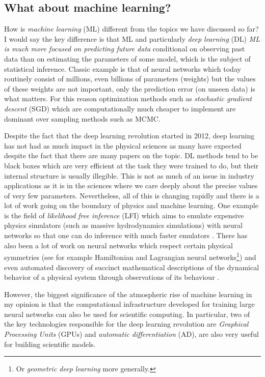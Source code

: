 \documentclass[12pt,dvipsnames]{report}
\begin{document}
\subsection{What about machine learning?}
How is \textsl{machine learning} (ML) different from the topics we have discussed so far? 
I would say the key difference is that ML and particularly \textsl{deep learning} (DL) 
\emph{ML is much more focused on predicting future data} conditional on observing 
past data  than on estimating the parameters of some model, which is the subject of 
statistical inference. Classic example is that of neural networks which 
today routinely consist of millions, even billions of parameters (weights) but 
the  values of these weights are not important, only the prediction error 
(on unseen data) is what matters. For this reason optimization methods such as 
\textsl{stochastic gradient descent} (SGD) which are computationally much 
cheaper to implement are dominant over sampling methods such as MCMC.

Despite the fact that the deep learning revolution started in 2012, 
deep learning has not had as much impact  in the physical sciences as many have 
expected  despite the fact that  there are many papers on the topic.
DL methods tend to be black boxes which are very efficient at 
the task they were trained to do, but their internal structure is usually 
illegible. This is not as much of an issue in industry applications as it is 
in the sciences where we care deeply about the precise values of very few 
parameters.
Nevertheless, all of this is changing rapidly and there is  a lot of work 
going on the boundary of physics and machine learning. One example is the field 
of \textsl{likelihood free inference} (LFI) which aims to emulate expensive 
physics simulators (such as massive hydrodynamics simulations) with neural 
networks so that one can do inference with much faster emulators 
\citep[see for example the review paper by]{2020PNAS..11730055C}. There has 
also been a lot of work on neural networks which respect certain physical 
symmetries (see for example Hamiltonian and Lagrangian neural 
networks\footnote{Or \textsl{geometric deep learning} more generally.})
and even automated discovery of succinct mathematical descriptions of 
the dynamical behavior of a physical system through observations of its 
behaviour \citep{arXiv:2006.11287}.

However, the biggest significance of the atmospheric rise of machine learning 
in my opinion is that the computational infrastructure developed for training 
large neural networks can also be used for scientific computing. In particular,
two of the key technologies responsible for the deep learning  revolution
are \textsl{Graphical Processing Units} (GPUs) and 
\textsl{automatic differentiation} (AD), are also very useful 
for building scientific models. 
\end{document}
